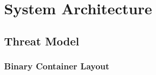 \documentclass[5p,times]{elsarticle}
\begin{document}
\section{System Architecture}
\subsection{Threat Model}
\subsubsection{Binary Container Layout}
\end{document}
